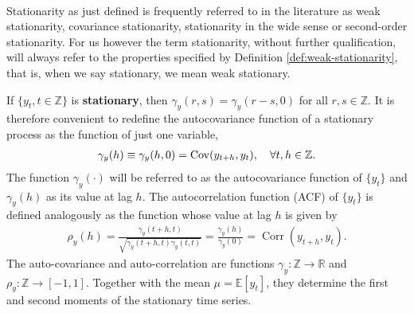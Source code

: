 \begin{remark}
    \
    
    Stationarity as just defined is frequently referred to in the literature as weak stationarity,
    covariance stationarity, stationarity in the wide sense or second-order stationarity.
    For us however the term stationarity, without further qualification, 
    will always refer to the properties specified by Definition \ref{def:weak-stationarity},
    that is, when we say stationary, we mean weak stationary.
\end{remark}

If $\{y_t, t \in \mathbb{Z}\}$ is \textbf{stationary}, then $\gamma_y(r,s) = \gamma_y(r-s, 0)$ for all $r,s \in \mathbb{Z}$.
It is therefore convenient to redefine the autocovariance function of a stationary
process as the function of just one variable,
\begin{gather*}
    \gamma_y(h) \equiv \gamma_y(h, 0) = \operatorname{Cov}(y_{t+h}, y_t), \quad \forall t, h \in \mathbb{Z}.
\end{gather*}
The function $\gamma_y(\cdot)$ will be referred to as the autocovariance function of $\{y_t\}$
and $\gamma_y(h)$ as its value at lag $h$. The autocorrelation function (ACF) of $\{y_t\}$
is defined analogously as the function whose value at lag $h$ is given by
\begin{gather*}
    \rho_y(h) = \frac{\gamma_y(t+h, t)}{\sqrt{\gamma_y(t+h, t) \gamma_y(t,t)} } = \frac{\gamma_y(h)}{\gamma_y(0)} = \operatorname{Corr}(y_{t+h}, y_t).
\end{gather*}
The auto-covariance and auto-correlation are functions $\gamma_y: \mathbb{Z} \to \mathbb{R}$ and $\rho_y: \mathbb{Z} \to [-1,1].$
Together with the mean $\mu = \mathbb{E}[y_t]$, they determine
the first and second moments of the stationary time series. 



